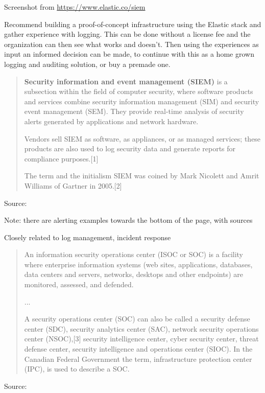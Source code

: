 \documentclass[Screen16to9,17pt]{foils}
\begin{document}

Screenshot from \url{https://www.elastic.co/siem}

Recommend building a proof-of-concept infrastructure using the Elastic stack and gather experience with logging. This can be done without a license fee and the organization can then see what works and doesn't. Then using the experiences as input an informed decision can be made, to continue with this as a home grown logging and auditing solution, or buy a premade one.




\begin{quote}
{\bf Security information and event management (SIEM)} is a subsection within the field of computer security, where software products and services combine security information management (SIM) and security event management (SEM). They provide real-time analysis of security alerts generated by applications and network hardware.

  Vendors sell SIEM as software, as appliances, or as managed services; these products are also used to log security data and generate reports for compliance purposes.[1]

  The term and the initialism SIEM was coined by Mark Nicolett and Amrit Williams of Gartner in 2005.[2]
\end{quote}
Source: 

\begin{list2}
  \item Note: there are alerting examples towards the bottom of the page, with sources
  \item Closely related to log management, incident response
\end{list2}






\begin{quote}
An information security operations center (ISOC or SOC) is a facility where enterprise information systems (web sites, applications, databases, data centers and servers, networks, desktops and other endpoints) are monitored, assessed, and defended.

...

A security operations center (SOC) can also be called a security defense center (SDC), security analytics center (SAC), network security operations center (NSOC),[3] security intelligence center, cyber security center, threat defense center, security intelligence and operations center (SIOC). In the Canadian Federal Government the term, infrastructure protection center (IPC), is used to describe a SOC.
\end{quote}
Source: 
\end{document}
